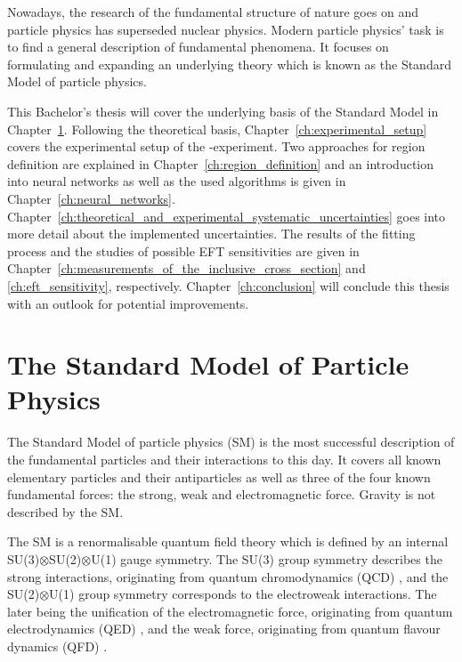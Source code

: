 \documentclass[bachelor,oneside, BCOR10mm,
			ngerman,english  %
]{GAUBM}
\begin{document}

Nowadays, the research of the fundamental structure of nature goes on and particle physics has superseded nuclear physics. Modern particle physics' task is to find a general description of fundamental phenomena. It focuses on formulating and expanding an underlying theory which is known as the Standard Model of particle physics.

This Bachelor's thesis will cover the underlying basis of the Standard Model in Chapter~\ref{ch:standard_model}. Following the theoretical basis, Chapter~\ref{ch:experimental_setup} covers the experimental setup of the \atlas-experiment. Two approaches for region definition are explained in Chapter~\ref{ch:region_definition} and an introduction into neural networks as well as the used algorithms is given in Chapter~\ref{ch:neural_networks}. Chapter~\ref{ch:theoretical_and_experimental_systematic_uncertainties} goes into more detail about the implemented uncertainties. The results of the fitting process and the studies of possible EFT sensitivities are given in Chapter~\ref{ch:measurements_of_the_inclusive_cross_section} and \ref{ch:eft_sensitivity}, respectively. Chapter~\ref{ch:conclusion} will conclude this thesis with an outlook for potential improvements.


\chapter{The Standard Model of Particle Physics}
\label{ch:standard_model}
The Standard Model of particle physics (SM) is the most successful description of the fundamental particles and their interactions to this day. It covers all known elementary particles and their antiparticles as well as three of the four known fundamental forces: the strong, weak and electromagnetic force. Gravity is not described by the SM. 

The SM is a renormalisable quantum field theory which is defined by an internal SU(3)$\otimes$SU(2)$\otimes$U(1) gauge symmetry. The SU(3) group symmetry describes the strong interactions, originating from quantum chromodynamics (QCD) \cite{qcd}, and the SU(2)$\otimes$U(1) group symmetry corresponds to the electroweak interactions. The later being the unification of the electromagnetic force, originating from quantum electrodynamics (QED) \cite{qed01, qed02, qed03}, and the weak force, originating from quantum flavour dynamics (QFD) \cite{qft}.
\end{document}
